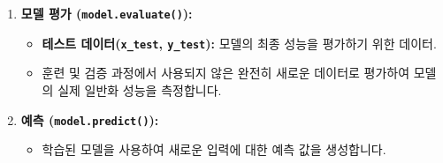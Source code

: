 \documentclass[11pt,a4paper]{book}
\theoremstyle{definition}
\begin{document}
\begin{enumerate}
\begin{itemize}
        \item \textbf{배치 크기(\texttt{batch\_size}):} 한 번의 가중치 업데이트에 사용될 샘플 수.
        \item \textbf{검증 데이터(\texttt{validation\_data}):} 훈련 중 모델의 일반화 성능을 평가하기 위한 데이터.
        \item \textbf{콜백(\texttt{callbacks}):} EarlyStopping, ModelCheckpoint 등을 사용하여 학습 과정 제어.
    \end{itemize}
    \item \textbf{모델 평가 (\texttt{model.evaluate()}):}
    \begin{itemize}
        \item \textbf{테스트 데이터(\texttt{x\_test}, \texttt{y\_test}):} 모델의 최종 성능을 평가하기 위한 데이터.
        \item 훈련 및 검증 과정에서 사용되지 않은 완전히 새로운 데이터로 평가하여 모델의 실제 일반화 성능을 측정합니다.
    \end{itemize}
    \item \textbf{예측 (\texttt{model.predict()}):}
    \begin{itemize}
        \item 학습된 모델을 사용하여 새로운 입력에 대한 예측 값을 생성합니다.
    \end{itemize}
\end{enumerate}
\end{document}
